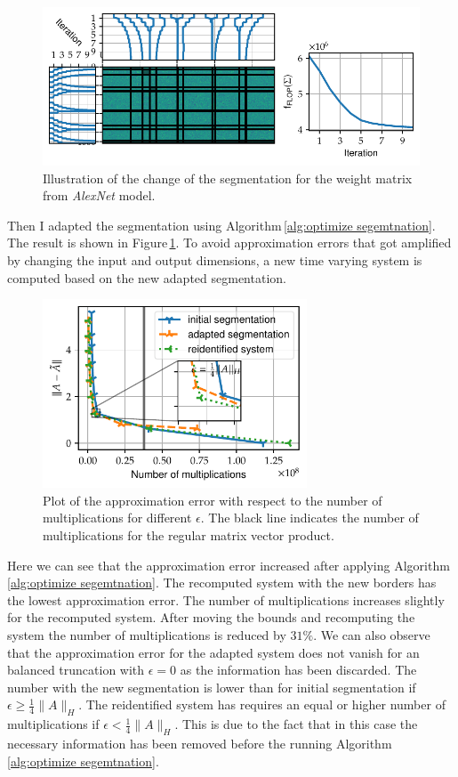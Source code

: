 \documentclass[doctype=mastersthesis,BCOR=15mm,biblatex]{ldvbook}%
\begin{document}
\begin{figure}[!htb]
	\centering
	\includegraphics[width=\textwidth]{Plots/move_example_alexnet_comp.pdf}
	\caption{Illustration of the change of the segmentation for the weight matrix from \emph{AlexNet} model.
	}
	\label{fig:alexnet_seperation_comp}
\end{figure}
Then I adapted the segmentation using Algorithm\,\ref{alg:optimize segemtnation}.
The result is shown in Figure\,\ref{fig:alexnet_seperation_comp}.
To avoid approximation errors that got amplified  by changing the input and output dimensions, a new time varying system is  computed based on the new adapted segmentation.
\begin{figure}[!htb]
	\centering
	\includegraphics[width=0.7\textwidth]{Plots/move_example_alexnet_error.pdf}
	\caption{Plot of the approximation error with respect to the number of multiplications for different $\epsilon$. 
	The black line indicates the number of multiplications for the regular matrix vector product. 
	}
	\label{fig:allexnet_err_cost}
\end{figure}
Here we can see that the approximation error increased after applying Algorithm\,\ref{alg:optimize segemtnation}.
The recomputed system with the new borders has the lowest approximation error.
The number of multiplications increases slightly for the recomputed system.
After moving the bounds and recomputing the system the number of multiplications is reduced by $31\%$.
We can also observe that the approximation error for the adapted system does not vanish for an balanced truncation with $\epsilon = 0$ as the information has been discarded.
The number with the new segmentation is lower than for initial segmentation if $\epsilon \geq \frac{1}{4} \|A\|_H$.
The reidentified system has requires an equal or higher number of multiplications if $\epsilon < \frac{1}{4} \|A\|_H$.
This is due to the fact that in this case the necessary information has been removed before the running Algorithm\,\ref{alg:optimize segemtnation}.
\end{document}
